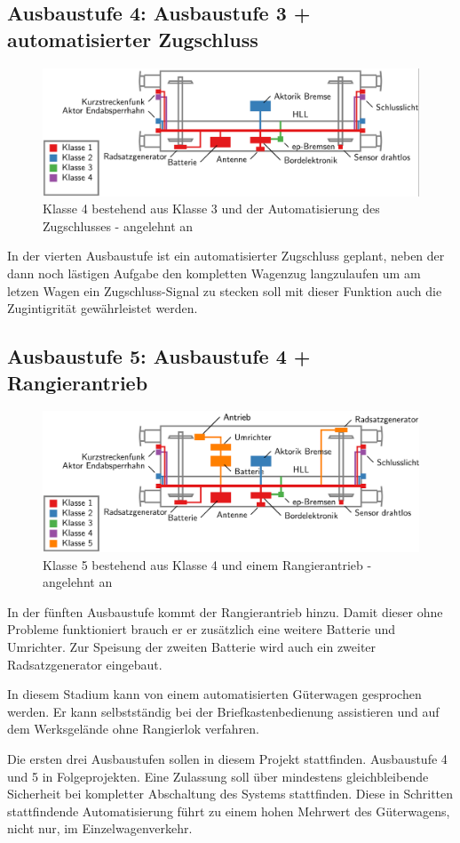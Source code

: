 \subsection{Ausbaustufe 4: Ausbaustufe 3 + automatisierter Zugschluss}
\begin{figure}[htbp] 
    \includegraphics[width=\textwidth]{Bilder/Ausbaustufen_4.PNG}
    \caption{Klasse 4 bestehend aus Klasse 3 und der Automatisierung des Zugschlusses - angelehnt an \cite{ETR_3}}
    \label{fig:Klasse4}
\end{figure} 
In der vierten Ausbaustufe ist ein automatisierter Zugschluss geplant, neben der dann noch lästigen Aufgabe den kompletten Wagenzug langzulaufen um am letzen Wagen ein Zugschluss-Signal zu stecken soll mit dieser Funktion auch die Zugintigrität gewährleistet werden.\par
\subsection{Ausbaustufe 5: Ausbaustufe 4 + Rangierantrieb}
\begin{figure}[htbp] 
    \includegraphics[width=\textwidth]{Bilder/Ausbaustufen_5.PNG}
    \caption{Klasse 5 bestehend aus Klasse 4 und einem Rangierantrieb - angelehnt an \cite{ETR_3}}
    \label{fig:Klasse5}
\end{figure} 
In der fünften Ausbaustufe kommt der Rangierantrieb hinzu. Damit dieser ohne Probleme funktioniert brauch er er zusätzlich eine weitere Batterie und Umrichter. Zur Speisung der zweiten Batterie wird auch ein zweiter Radsatzgenerator eingebaut.\par
In diesem Stadium kann von einem automatisierten Güterwagen gesprochen werden. Er kann selbstständig bei der Briefkastenbedienung assistieren und auf dem Werksgelände ohne Rangierlok verfahren.\par
Die ersten drei Ausbaustufen sollen in diesem Projekt stattfinden. Ausbaustufe 4 und 5 in Folgeprojekten. Eine Zulassung soll über mindestens gleichbleibende Sicherheit bei kompletter Abschaltung des Systems stattfinden. Diese in Schritten stattfindende Automatisierung führt zu einem hohen Mehrwert des Güterwagens, nicht nur, im Einzelwagenverkehr.

